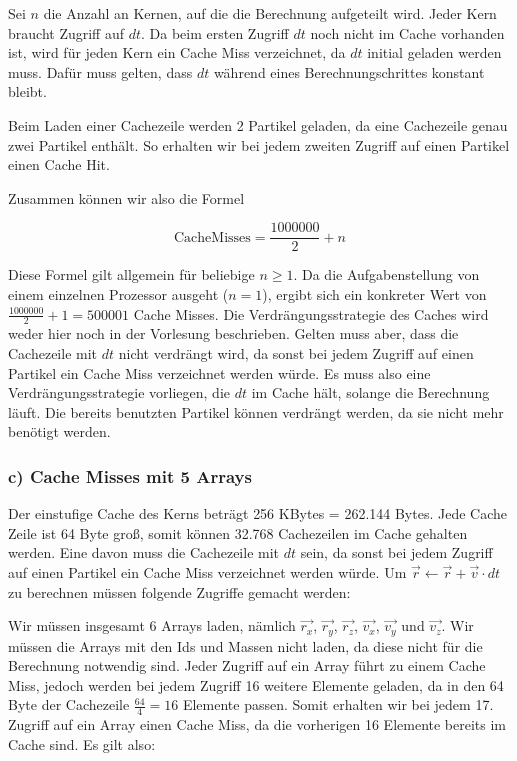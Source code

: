 Sei $n$ die Anzahl an Kernen, auf die die Berechnung aufgeteilt wird. Jeder Kern braucht Zugriff auf $dt$. Da beim ersten Zugriff $dt$ noch nicht im Cache vorhanden ist, wird für jeden Kern ein Cache Miss verzeichnet, da $dt$ initial geladen werden muss. Dafür muss gelten, dass $dt$ während eines Berechnungschrittes konstant bleibt.

Beim Laden einer Cachezeile werden 2 Partikel geladen, da eine Cachezeile genau zwei Partikel enthält. So erhalten wir bei jedem zweiten Zugriff auf einen Partikel einen Cache Hit.

Zusammen können wir also die Formel

$$
\text{CacheMisses} = \frac{1000000}{2} + n
$$

Diese Formel gilt allgemein für beliebige $n \geq 1$. Da die Aufgabenstellung von einem einzelnen Prozessor ausgeht ($n = 1$), ergibt sich ein konkreter Wert von $\frac{1000000}{2} + 1 = 500001$ Cache Misses. Die Verdrängungsstrategie des Caches wird weder hier noch in der Vorlesung beschrieben. Gelten muss aber, dass die Cachezeile mit $dt$ nicht verdrängt wird, da sonst bei jedem Zugriff auf einen Partikel ein Cache Miss verzeichnet werden würde. Es muss also eine Verdrängungsstrategie vorliegen, die $dt$ im Cache hält, solange die Berechnung läuft. Die bereits benutzten Partikel können verdrängt werden, da sie nicht mehr benötigt werden.

\subsubsection*{c) Cache Misses mit 5 Arrays}
\label{sec:cache-misses-arrays}

Der einstufige Cache des Kerns beträgt 256 KBytes = 262.144 Bytes. Jede Cache Zeile ist 64 Byte groß, somit können 32.768 Cachezeilen im Cache gehalten werden. Eine davon muss die Cachezeile mit $dt$ sein, da sonst bei jedem Zugriff auf einen Partikel ein Cache Miss verzeichnet werden würde. 
Um $\overrightarrow{r} \leftarrow \overrightarrow{r} + \overrightarrow{v} \cdot dt$ zu berechnen müssen folgende Zugriffe gemacht werden:

Wir müssen insgesamt 6 Arrays laden, nämlich $\overrightarrow{r_x}$, $\overrightarrow{r_y}$, $\overrightarrow{r_z}$, $\overrightarrow{v_x}$, $\overrightarrow{v_y}$ und $\overrightarrow{v_z}$. Wir müssen die Arrays mit den Ids und Massen nicht laden, da diese nicht für die Berechnung notwendig sind. Jeder Zugriff auf ein Array führt zu einem Cache Miss, jedoch werden bei jedem Zugriff 16 weitere Elemente geladen, da in den 64 Byte der Cachezeile $\frac{64}{4} = 16$ Elemente passen. Somit erhalten wir bei jedem 17. Zugriff auf ein Array einen Cache Miss, da die vorherigen 16 Elemente bereits im Cache sind. Es gilt also:

